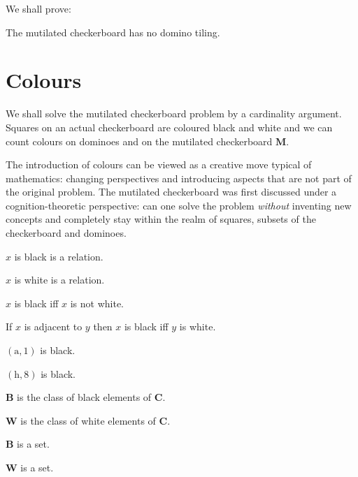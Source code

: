 \documentclass{article}
\newcommand{\fileA}{\mathrm{a}}
\newcommand{\fileH}{\mathrm{h}}
\newcommand{\Checkerboard}{\mathbf{C}}
\newcommand{\Mutilated}{\mathbf{M}}
\newcommand{\Black}{\mathbf{B}}
\newcommand{\White}{\mathbf{W}}
\begin{document}
\noindent
We shall prove:

\begin{quotedtheorem}
    The mutilated checkerboard has no domino tiling.
\end{quotedtheorem}



\section{Colours}

We shall solve the mutilated checkerboard problem by a cardinality argument.
Squares on an actual checkerboard are coloured black and white and we can count
colours on dominoes and on the mutilated checkerboard $\Mutilated$.

The introduction of colours can be viewed as a creative move typical of
mathematics: changing perspectives and introducing aspects that are not part
of the original problem. The mutilated checkerboard was first discussed under
a cognition-theoretic perspective: can one solve the problem \emph{without}
inventing new concepts and completely stay within the realm of squares,
subsets of the checkerboard and dominoes.


\begin{forthel}
    \begin{signature} $x$ is black is a relation. \end{signature}
    \begin{signature} $x$ is white is a relation. \end{signature}

    \begin{axiom} $x$ is black iff $x$ is not white. \end{axiom}
    \begin{axiom} If $x$ is adjacent to $y$ then $x$ is black iff $y$ is white. \end{axiom}

    \begin{axiom} $(\fileA,1)$ is black. \end{axiom}
    \begin{axiom} $(\fileH,8)$ is black. \end{axiom}

    \begin{definition} $\Black$ is the class of black elements of $\Checkerboard$. \end{definition}
    \begin{definition} $\White$ is the class of white elements of $\Checkerboard$. \end{definition}

    \begin{lemma} $\Black$ is a set. \end{lemma}
    \begin{lemma} $\White$ is a set. \end{lemma}
\end{forthel}
\end{document}

